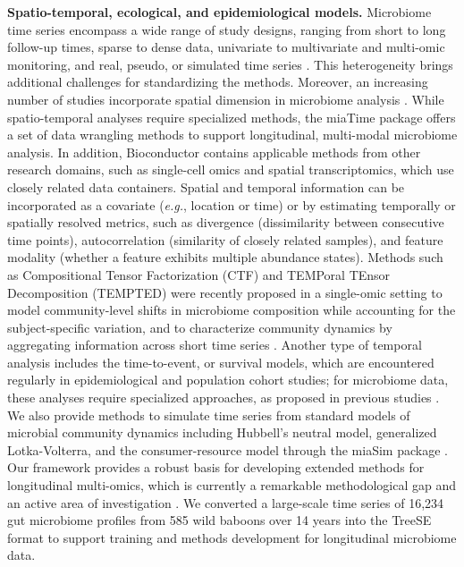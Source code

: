 \documentclass[
  sn-nature,
]{sn-jnl}
\begin{document}
\textbf{Spatio-temporal, ecological, and epidemiological models.}
Microbiome time series \citep{berg2020} encompass a wide range of study
designs, ranging from short to long follow-up times, sparse to dense
data, univariate to multivariate and multi-omic monitoring, and real,
pseudo, or simulated time series
\citep{velten2022, sherwani2025, fukuyama2017}. This heterogeneity
brings additional challenges for standardizing the methods. Moreover, an
increasing number of studies incorporate spatial dimension in microbiome
analysis \citep{ruuskanen2021}. While spatio-temporal analyses require
specialized methods, the miaTime package offers a set of data wrangling
methods to support longitudinal, multi-modal microbiome analysis. In
addition, Bioconductor contains applicable methods from other research
domains, such as single-cell omics and spatial transcriptomics, which
use closely related data containers. Spatial and temporal information
can be incorporated as a covariate (\emph{e.g.}, location or time) or by
estimating temporally or spatially resolved metrics, such as divergence
(dissimilarity between consecutive time points), autocorrelation
(similarity of closely related samples), and feature modality (whether a
feature exhibits multiple abundance states). Methods such as
Compositional Tensor Factorization (CTF) \citep{martino2021} and
TEMPoral TEnsor Decomposition (TEMPTED) \citep{shi2024} were recently
proposed in a single-omic setting to model community-level shifts in
microbiome composition while accounting for the subject-specific
variation, and to characterize community dynamics by aggregating
information across short time series \citep{ross2026}. Another type of
temporal analysis includes the time-to-event, or survival models, which
are encountered regularly in epidemiological and population cohort
studies; for microbiome data, these analyses require specialized
approaches, as proposed in previous studies \citep{salosensaari2021}. We
also provide methods to simulate time series from standard models of
microbial community dynamics including Hubbell's neutral model,
generalized Lotka-Volterra, and the consumer-resource model through the
miaSim package \citep{gao2023}. Our framework provides a robust basis
for developing extended methods for longitudinal multi-omics, which is
currently a remarkable methodological gap and an active area of
investigation \citep{sherwani2025}. We converted a large-scale time
series of 16,234 gut microbiome profiles from 585 wild baboons over 14
years \citep{grieneisen2021} into the TreeSE format to support training
and methods development for longitudinal microbiome data.
\end{document}
